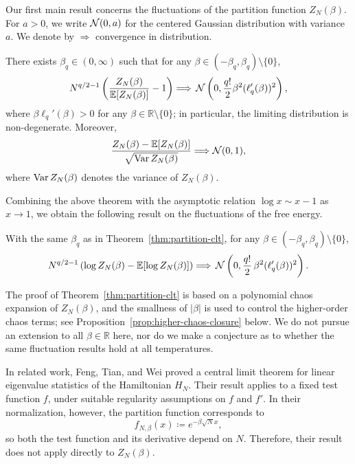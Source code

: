 \documentclass[../CLT_SYK.tex]{subfiles}
\begin{document}
Our first main result concerns the fluctuations of the partition function ${Z_N(\beta)}$. For $a > 0$, we write $\mathcal N(0, a)$ for the centered Gaussian distribution with variance $a$. We denote by $\Longrightarrow$ convergence in distribution.
\begin{theorem}
\label{thm:partition-clt}
There exists $\beta_q\in (0,\infty)$ such that for any $\beta\in (-\beta_q,\beta_q) \setminus \{0\}$,  
 \begin{equation}\label{eq:scaled-relative-clt}
  N^{q/2-1}\left( \frac{Z_N(\beta)}{\mathbb E[Z_N(\beta)]} - 1\right)
  \Longrightarrow
  \,\mathcal N\left(0,\frac{q!}{2}\beta^2(\ell_q'(\beta))^2\right),
\end{equation}
where  $\beta \ell_q'(\beta)>0$ for any $\beta\in \mathbb R\setminus \{0\}$; in particular, the limiting distribution is non-degenerate. Moreover,
\begin{equation}\label{eq:standardized-clt}
  \frac{Z_N(\beta)-\mathbb E[Z_N(\beta)]}
  {\sqrt{\operatorname{Var} Z_N(\beta)}}
  \Longrightarrow\mathcal N(0,1),
\end{equation}
where $\operatorname{Var} Z_N(\beta)$ denotes the variance of $Z_N(\beta)$.
\end{theorem}

Combining the above theorem with the asymptotic relation $\log x \sim x-1$ as $x \to 1$, we obtain the following result on the fluctuations of the free energy.
\begin{theorem}\label{thm:free-energy-clt}
With the same $\beta_q$ as in Theorem~\ref{thm:partition-clt}, for any $\beta\in (-\beta_q,\beta_q) \setminus \{0\}$,
\[
  N^{q/2-1}\left(
    \log Z_N(\beta)-\mathbb E[\log Z_N(\beta)]
  \right)
  \Longrightarrow
  \,\mathcal N\left(0,\frac{q!}{2}\,\beta^2(\ell_q'(\beta))^2\right).
\]
\end{theorem}

\begin{remark}
The proof of Theorem~\ref{thm:partition-clt} is based on a polynomial chaos expansion of $Z_N(\beta)$, and the smallness of $|\beta|$ is used to control the higher-order chaos terms; see Proposition~\ref{prop:higher-chaos-closure} below.
We do not pursue an extension to all $\beta\in\mathbb R$ here, nor do we make a conjecture as to whether the same fluctuation results hold at all temperatures.
\end{remark}

\begin{remark}
In related work, Feng, Tian, and Wei \cite{FTW2018} proved a central limit theorem for linear eigenvalue statistics of the Hamiltonian $H_N$. Their result applies to a fixed test function \(f\), under suitable regularity assumptions on \(f\) and \(f'\). In their normalization, however, the partition function corresponds to
\[
f_{N,\beta}(x) \coloneqq e^{-\beta \sqrt{N} x},
\]
so both the test function and its derivative depend on \(N\). Therefore, their result does not apply directly to \(Z_N(\beta)\).
\end{remark}
\end{document}
